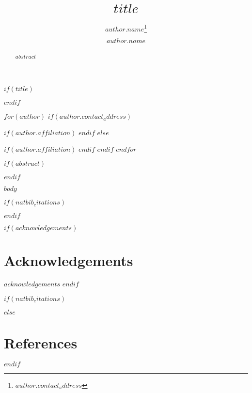 \documentclass[$CL_style$]{clv3}
\begin{document}
$if(title)$
  \title{$title$}
$endif$

$for(author)$
  $if(author.contact_address)$
    \author{$author.name$\thanks{$author.contact_address$}}
    $if(author.affiliation)$
    $endif$
  $else$
    \author{$author.name$}
    $if(author.affiliation)$
    $endif$
  $endif$
$endfor$

\maketitle

$if(abstract)$
\begin{abstract}
$abstract$
\end{abstract}
$endif$

$body$

$if(natbib_citations)$
\begin{multicols}{2}
$endif$

$if(acknowledgements)$
\section*{Acknowledgements}\label{acknowledgements}
$acknowledgements$
$endif$

$if(natbib_citations)$

\end{multicols}
$else$
\section*{References}\label{references}

$endif$

\end{document}
